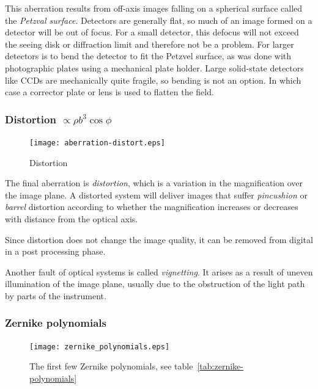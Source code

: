 This aberration results from off-axis images falling on a spherical surface called the
{\it Petzval surface}. Detectors are generally flat, so much of an image formed on a 
detector will be out of focus. For a small detector, this defocus will not exceed the 
seeing disk or diffraction limit and therefore not be a problem. For larger detectors
is to bend the detector to fit the Petzvel surface, as was done with photographic plates
using a mechanical plate holder. Large solid-state detectors like CCDs are mechanically 
quite fragile, so bending is not an option. In which case a corrector plate or lens is
used to flatten the field.

\subsubsection{Distortion $\propto \rho b^3\cos\phi$}

\begin{figure}[th!]
	\centering
	\texttt{[image: aberration-distort.eps]}
  \caption{Distortion}
  \label{fig:aberration-distortion}
\end{figure}

The final aberration is {\it distortion}, which is a variation in the 
magnification over the image plane. A distorted system will deliver images
that suffer {\it pincushion} or {\it barrel} distortion according to 
whether the magnification increases or decreases with distance from the 
optical axis.

Since distortion does not change the image quality, it can be removed from 
digital in a post processing phase.

Another fault of optical systems is called {\it vignetting}. It arises as a result
of uneven illumination of the image plane, usually due to the obstruction of 
the light path by parts of the instrument.

\subsubsection{Zernike polynomials}

\begin{figure}[th!]
	\centering
	\texttt{[image: zernike\_polynomials.eps]}
  \caption{The first few Zernike polynomials, see table~\ref{tab:zernike-polynomials} 
}
 \label{fig:zernike-polynomials}
\end{figure}

